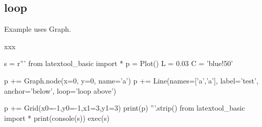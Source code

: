 \subsection{loop}

Example uses Graph.

xxx
\begin{python}
s = r'''
from latextool_basic import *
p = Plot()
L = 0.03
C = 'blue!50'

p += Graph.node(x=0, y=0, name='a')
p += Line(names=['a','a'], label='test', anchor='below', loop='loop above')

p += Grid(x0=-1,y0=-1,x1=3,y1=3)
print(p)
'''.strip()
from latextool_basic import *
print(console(s))
exec(s)
\end{python}

